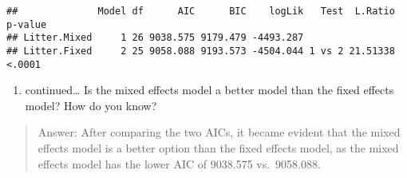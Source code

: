 \documentclass[]{article}
\providecommand{\tightlist}{%
  \setlength{\itemsep}{0pt}\setlength{\parskip}{0pt}}
\begin{document}
\begin{verbatim}
##              Model df      AIC      BIC    logLik   Test  L.Ratio p-value
## Litter.Mixed     1 26 9038.575 9179.479 -4493.287                        
## Litter.Fixed     2 25 9058.088 9193.573 -4504.044 1 vs 2 21.51338  <.0001
\end{verbatim}

\begin{enumerate}
\def\labelenumi{\alph{enumi}.}
\setcounter{enumi}{3}
\tightlist
\item
  continued\ldots{} Is the mixed effects model a better model than the
  fixed effects model? How do you know?
\end{enumerate}

\begin{quote}
Answer: After comparing the two AICs, it became evident that the mixed
effects model is a better option than the fixed effects model, as the
mixed effects model has the lower AIC of 9038.575 vs.~9058.088.
\end{quote}
\end{document}
